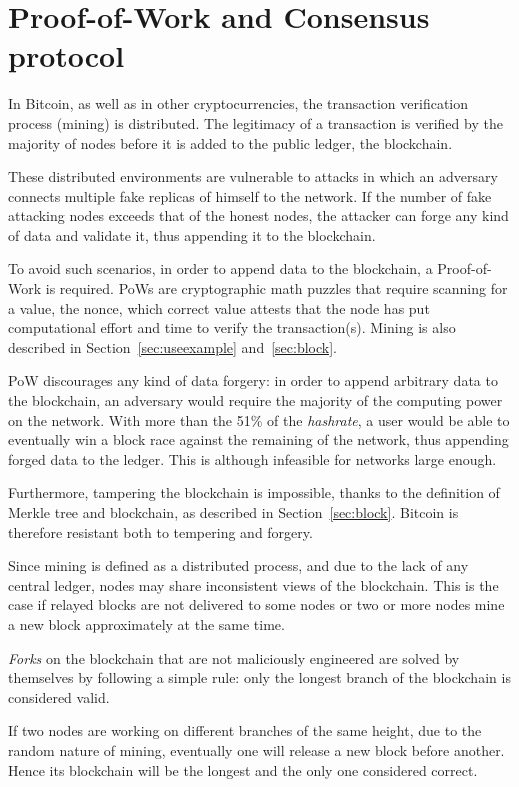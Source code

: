 \section{Proof-of-Work and Consensus protocol}\label{sec:consensus}
In Bitcoin, as well as in other cryptocurrencies, the transaction verification process (mining) is distributed. The legitimacy of a transaction is verified by the majority of nodes before it is added to the public ledger, the blockchain.

These distributed environments are vulnerable to attacks in which an adversary connects multiple fake replicas of himself to the network. If the number of fake attacking nodes exceeds that of the honest nodes, the attacker can forge any kind of data and validate it, thus appending it to the blockchain.

To avoid such scenarios, in order to append data to the blockchain, a Proof-of-Work is required. PoWs are cryptographic math puzzles that require scanning for a value, the nonce, which correct value attests that the node has put computational effort and time to verify the transaction(s). Mining is also described in Section~\ref{sec:useexample} and~\ref{sec:block}.

PoW discourages any kind of data forgery: in order to append arbitrary data to the blockchain, an adversary would require the majority of the computing power on the network. With more than the 51\% of the \textit{hashrate}, a user would be able to eventually win a block race against the remaining of the network, thus appending forged data to the ledger. This is although infeasible for networks large enough.
 
Furthermore, tampering the blockchain is impossible, thanks to the definition of Merkle tree and blockchain, as described in Section~\ref{sec:block}. Bitcoin is therefore resistant both to tempering and forgery.

Since mining is defined as a distributed process, and due to the lack of any central ledger, nodes may share inconsistent views of the blockchain. This is the case if relayed blocks are not delivered to some nodes or two or more nodes mine a new block approximately at the same time.

\emph{Forks} on the blockchain that are not maliciously engineered are solved by themselves by following a simple rule: only the longest branch of the blockchain is considered valid.

If two nodes are working on different branches of the same height, due to the random nature of mining, eventually one will release a new block before another. Hence its blockchain will be the longest and the only one considered correct.

